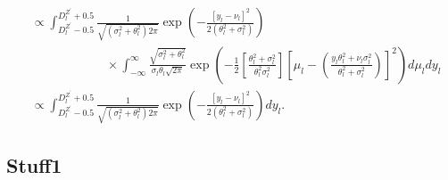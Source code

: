 \documentclass[a4paper]{article}
\begin{document}
\begin{align}
    &\propto \int_{D^{Z^\prime}_l - 0.5}^{D^{Z^\prime}_l + 0.5} \frac{1}{\sqrt{\left(\sigma^2_l + \theta^2_l\right)2\pi}} \exp\left(-\frac{\left[y_l - \nu_l\right]^2}{2\left(\theta^2_l + \sigma^2_l\right)}\right)\nonumber\\
    & \qquad \qquad \qquad \times \int_{-\infty}^\infty \frac{\sqrt{\sigma^2_l + \theta^2_l}}{\sigma_l\theta_l \sqrt{2\pi}}\exp\left(-\frac{1}{2}\left[\frac{\theta^2_l + \sigma^2_l}{\theta^2_l\sigma^2_l}\right]\left[\mu_l - \left(\frac{y_l\theta^2_l + \nu_l\sigma^2_l}{\theta^2_l + \sigma^2_l}\right)\right]^2\right) d\mu_l dy_l\nonumber\\
    &\propto \int_{D^{Z^\prime}_l - 0.5}^{D^{Z^\prime}_l + 0.5} \frac{1}{\sqrt{\left(\sigma^2_l + \theta^2_l\right)2\pi}} \exp\left(-\frac{\left[y_l - \nu_l\right]^2}{2\left(\theta^2_l + \sigma^2_l\right)}\right)dy_l.\label{eq:margint}
\end{align}

\subsection{Stuff1}
\end{document}

